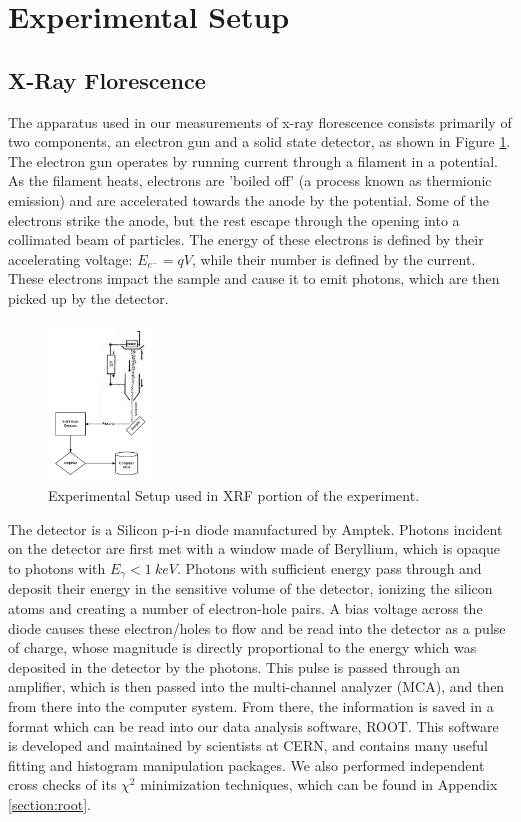 \documentclass[%
 reprint,
 amsmath,amssymb,
 aps,
 pra,
]{revtex4-1}
\begin{document}
\section{Experimental Setup}

\subsection{X-Ray Florescence}

The apparatus used in our measurements of x-ray florescence consists primarily of two components, an electron gun and a solid state detector, as shown in Figure \ref{fig:xrf_setup}. The electron gun operates by running current through a filament in a potential. As the filament heats, electrons are 'boiled off' (a process known as thermionic emission) and are accelerated towards the anode by the potential. Some of the electrons strike the anode, but the rest escape through the opening into a collimated beam of particles. The energy of these electrons is defined by their accelerating voltage: $E_{e^-} = qV$, while their number is defined by the current. These electrons impact the sample and cause it to emit photons, which are then picked up by the detector. 

\begin{figure}[H]
	\centering
	\includegraphics[width=0.25\textwidth]{xrf_experiment.png}
	\caption{Experimental Setup used in XRF portion of the experiment.}
	\label{fig:xrf_setup}
\end{figure}

The detector is a Silicon p-i-n diode manufactured by Amptek. Photons incident on the detector are first met with a window made of Beryllium, which is opaque to photons with $E_\gamma <1~keV$. Photons with sufficient energy pass through and deposit their energy in the sensitive volume of the detector, ionizing the silicon atoms and creating a number of electron-hole pairs. A bias voltage across the diode causes these electron/holes to flow and be read into the detector as a pulse of charge, whose magnitude is directly proportional to the energy which was deposited in the detector by the photons. This pulse is passed through an amplifier, which is then passed into the multi-channel analyzer (MCA), and then from there into the computer system. From there, the information is saved in a format which can be read into our data analysis software, ROOT. This software is developed and maintained by scientists at CERN, and contains many useful fitting and histogram manipulation packages. We also performed independent cross checks of its $\chi^2$ minimization techniques, which can be found in Appendix \ref{section:root}.
\end{document}
